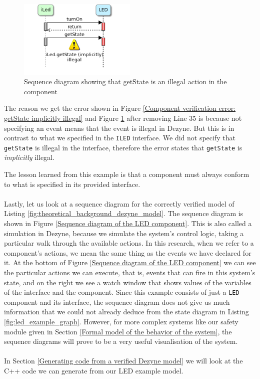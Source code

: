 \documentclass[12pt]{scrreprt}
\begin{document}
\begin{appendices}
\begin{figure}[H]
    \centering
    \includegraphics[width=0.5\textwidth]{Figures/theoretical_background/getState_implicitly_illegal.png}
    \caption{Sequence diagram showing that getState is an illegal action in the component}
    \label{Sequence diagram showing that getState is an illegal action in the component}
\end{figure}

The reason we get the error shown in Figure \ref{Component verification error: getState implicitly illegal} and Figure \ref{Sequence diagram showing that getState is an illegal action in the component} after removing Line 35 is because not specifying an event means that the event is illegal in Dezyne. But this is in contrast to what we specified in the \texttt{ILED} interface. We did not specify that \texttt{getState} is illegal in the interface, therefore the error states that \texttt{getState} is \textit{implicitly} illegal.
\par
The lesson learned from this example is that a component must always conform to what is specified in its provided interface.
\\\\
Lastly, let us look at a sequence diagram for the correctly verified model of Listing \ref{fig:theoretical_background_dezyne_model}. The sequence diagram is shown in Figure \ref{Sequence diagram of the LED component}. This is also called a simulation in Dezyne, because we simulate the system's control logic, taking a particular walk through the available actions. In this research, when we refer to a component's actions, we mean the same thing as the events we have declared for it. At the bottom of Figure \ref{Sequence diagram of the LED component} we can see the particular actions we can execute, that is, events that can fire in this system's state, and on the right we see a watch window that shows values of the variables of the interface and the component. Since this example consists of just a \texttt{LED} component and its interface, the sequence diagram does not give us much information that we could not already deduce from the state diagram in Listing \ref{fig:led_example_graph}. However, for more complex systems like our safety module given in Section \ref{Formal model of the behavior of the system}, the sequence diagrams will prove to be a very useful visualisation of the system.
\\\\
In Section \ref{Generating code from a verified Dezyne model} we will look at the C++ code we can generate from our LED example model.


\end{appendices}
\end{document}
